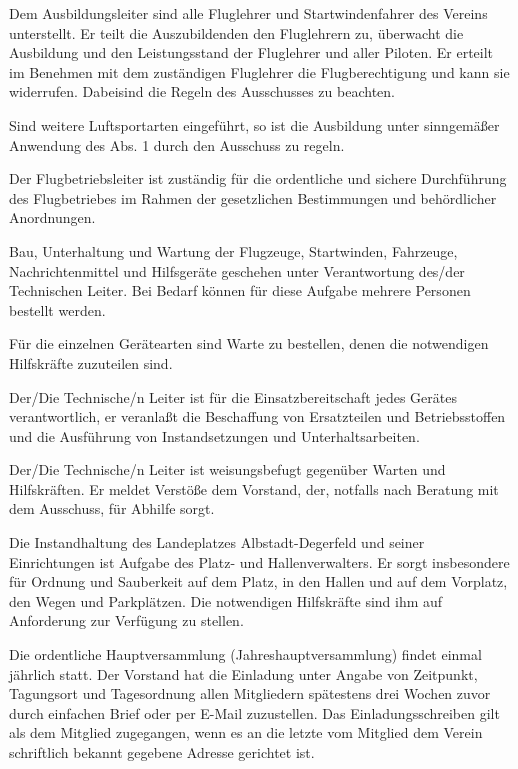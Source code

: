 \documentclass[10pt,a4paper,parskip=half]{scrartcl}
\begin{document}
\begin{contract}
    Dem Ausbildungsleiter sind alle Fluglehrer und Startwindenfahrer des Vereins unterstellt.
    Er teilt die Auszubildenden den Fluglehrern zu,
    überwacht die Ausbildung und den Leistungsstand der Fluglehrer und aller Piloten.
    Er erteilt im Benehmen mit dem zuständigen Fluglehrer die Flugberechtigung und kann sie widerrufen.
    Dabeisind die Regeln des Ausschusses zu beachten.
    
    Sind weitere Luftsportarten eingeführt,
    so ist die Ausbildung unter sinngemäßer Anwendung des Abs. 1 durch den Ausschuss zu regeln.
    
    Der Flugbetriebsleiter ist zuständig für die ordentliche und sichere Durchführung des Flugbetriebes im Rahmen der gesetzlichen Bestimmungen und behördlicher Anordnungen.
    
    Bau,
    Unterhaltung und Wartung der Flugzeuge,
    Startwinden,
    Fahrzeuge,
    Nachrichtenmittel und Hilfsgeräte geschehen unter Verantwortung des/der Technischen Leiter.
    Bei Bedarf können für diese Aufgabe mehrere Personen bestellt werden.
    
    Für die einzelnen Gerätearten sind Warte zu bestellen,
    denen die notwendigen Hilfskräfte zuzuteilen sind.
    
    Der/Die Technische/n Leiter ist für die Einsatzbereitschaft jedes Gerätes verantwortlich,
    er veranlaßt die Beschaffung von Ersatzteilen und Betriebsstoffen und die Ausführung von Instandsetzungen und Unterhaltsarbeiten.
    
    Der/Die Technische/n Leiter ist weisungsbefugt gegenüber Warten und Hilfskräften.
    Er meldet Verstöße dem Vorstand,
    der,
    notfalls nach Beratung mit dem Ausschuss,
    für Abhilfe sorgt.
    
    Die Instandhaltung des Landeplatzes Albstadt-Degerfeld und seiner Einrichtungen ist Aufgabe des Platz- und Hallenverwalters.
    Er sorgt insbesondere für Ordnung und Sauberkeit auf dem Platz,
    in den Hallen und auf dem Vorplatz,
    den Wegen und Parkplätzen.
    Die notwendigen Hilfskräfte sind ihm auf Anforderung zur Verfügung zu stellen.
    
    \label{C:Hauptversammlung}
    Die ordentliche Hauptversammlung (Jahreshauptversammlung) findet einmal jährlich statt.
    Der Vorstand hat die Einladung unter Angabe von Zeitpunkt,
    Tagungsort und Tagesordnung allen Mitgliedern spätestens drei Wochen zuvor durch einfachen Brief oder per E-Mail zuzustellen.
    Das Einladungsschreiben gilt als dem Mitglied zugegangen,
    wenn es an die letzte vom Mitglied dem Verein schriftlich bekannt gegebene Adresse gerichtet ist.
    

\end{contract}
\end{document}

